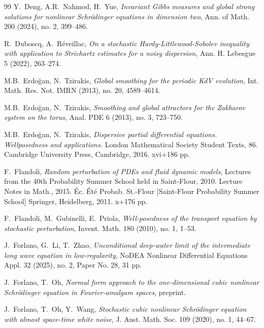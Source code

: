 \documentclass[letterpaper, 11pt,  reqno]{amsart}
\newcommand{\1}{\hspace{0.5mm}\text{I}\hspace{0.5mm}}
\numberwithin{equation}{section}
\numberwithin{theorem}{section}
\begin{document}
\begin{thebibliography}{99}
Y.~Deng, A.R.~Nahmod, H.~Yue,
{\it Invariant Gibbs measures and global strong solutions for nonlinear Schr\"odinger equations in dimension two},
Ann. of Math.  200 (2024), no. 2, 399--486.

 
 
 

R.~Duboscq, A.~R\'eveillac, 
{\it On a stochastic Hardy-Littlewood-Sobolev inequality with application to Strichartz estimates for a noisy dispersion}, 
Ann. H. Lebesgue 5 (2022), 263--274. 


M.B.~Erdo\u{g}an, N.~Tzirakis, 
{\it Global smoothing for the periodic KdV evolution}, 
Int. Math. Res. Not. IMRN (2013), no. 20, 4589--4614.


M.B.~Erdo\u{g}an, N.~Tzirakis, 
{\it Smoothing and global attractors for the Zakharov system on the torus},
 Anal. PDE 6 (2013), no. 3, 723--750.


M.B.~Erdo\u{g}an, N.~Tzirakis, 
{\it Dispersive partial differential equations. Wellposedness and applications.} London Mathematical Society Student Texts, 86. Cambridge University Press, Cambridge, 2016. xvi+186 pp.


F.~Flandoli, 
{\it Random perturbation of PDEs and fluid dynamic models},
 Lectures from the 40th Probability Summer School held in Saint-Flour, 2010. Lecture Notes in Math., 2015. 
 \'Ec. \'Et\'e Probab. St.-Flour [Saint-Flour Probability Summer School] Springer, Heidelberg, 2011. x+176 pp.




F.~Flandoli, M.~Gubinelli, E.~Priola,
{\it Well-posedness of the transport equation by stochastic perturbation},
Invent. Math. 180 (2010), no. 1, 1--53.





J.~Forlano, G.~Li, T.~Zhao,
{\it Unconditional deep-water limit of the intermediate long wave equation in low-regularity},
 NoDEA Nonlinear Differential Equations Appl. 32 (2025), no. 2, Paper No. 28, 31 pp.


J.~Forlano, T.~Oh, 
{\it  Normal form approach to the one-dimensional cubic nonlinear Schr\"odinger equation in Fourier-amalgam spaces}, preprint.



J.~Forlano, T.~Oh, Y.~Wang,
{\it  Stochastic cubic nonlinear Schr\"odinger equation with almost space-time white noise}, J. Aust. Math. Soc. 109 (2020), no. 1, 44--67. 



\end{thebibliography}
\end{document}
